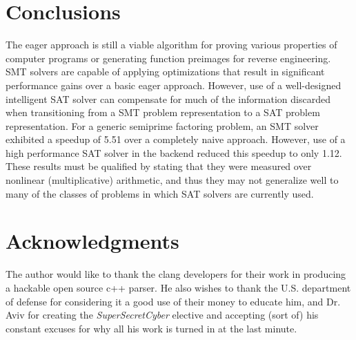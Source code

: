 \documentclass{sig-alternate}
\begin{document}
\section{Conclusions}
The eager approach is still a viable algorithm for proving various properties
of computer programs or generating function preimages for reverse engineering.
SMT solvers are capable of applying optimizations that result in significant
performance gains over a basic eager approach.  However, use of a well-designed
intelligent SAT solver can compensate for much of the information discarded when
transitioning from a SMT problem representation to a SAT problem representation.
For a generic semiprime factoring problem, an SMT solver exhibited a speedup of
5.51 over a completely naive approach.  However, use of a high performance SAT
solver in the backend reduced this speedup to only 1.12.  These results must
be qualified by stating that they were measured over nonlinear (multiplicative)
arithmetic, and thus they may not generalize well to many of the classes of
problems in which SAT solvers are currently used.

\section{Acknowledgments}
The author would like to thank the clang developers for their work in producing
a hackable open source c++ parser.  He also wishes to thank the U.S. department
of defense for considering it a good use of their money to educate him, and Dr.
Aviv for creating the \textit{SuperSecretCyber} elective and accepting (sort of)
his constant excuses for why all his work is turned in at the last minute.



\end{document}
